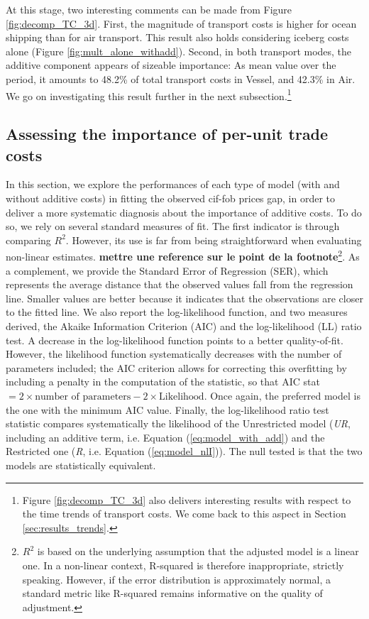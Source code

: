 \documentclass[a4paper,11pt]{article}
\begin{document}
At this stage, two interesting comments can be made from Figure \ref{fig:decomp_TC_3d}. First, the magnitude of transport costs is higher for ocean shipping than for air transport. This result also holds considering iceberg costs alone (Figure \ref{fig:mult_alone_withadd}). Second, in both transport modes, the additive component appears of sizeable importance: As mean value over the period, it amounts to 48.2\% of total transport costs in Vessel, and 42.3\% in Air. We go on investigating this result further in the next subsection.\footnote{Figure \ref{fig:decomp_TC_3d} also delivers interesting results with respect to the time trends of transport costs. We come back to this aspect in Section \ref{sec:results_trends}.}

\subsection{Assessing the importance of per-unit trade costs}

In this section, we explore the performances of each type of model (with and without additive costs) in fitting the observed cif-fob prices gap, in order to deliver a more systematic diagnosis about the importance of additive costs. To do so, we rely on several standard measures of fit. The first indicator is through comparing $R^{2}$. However, its use is far from being straightforward when evaluating non-linear estimates. \textbf{mettre une reference sur le point de la footnote}\footnote{$R^2$ is based on the underlying assumption that the adjusted model is a linear one. In a non-linear context, R-squared is therefore inappropriate, strictly speaking. However, if the error distribution is approximately normal, a standard metric like R-squared remains informative on the quality of adjustment.}. As a complement, we provide the Standard Error of Regression (SER), which represents the average distance that the observed values fall from the regression line. Smaller values are better because it indicates that the observations are closer to the fitted line. We also report the log-likelihood function, and two measures derived, the Akaike Information Criterion (AIC) and the log-likelihood (LL) ratio test. A decrease in the log-likelihood function points to a better quality-of-fit. However, the likelihood function systematically decreases with the number of parameters included; the AIC criterion allows for correcting this overfitting by including a penalty in the computation of the statistic, so that AIC stat $= 2 \times \textrm{number of parameters} - 2 \times \textrm{Likelihood} $. Once again, the preferred model is the one with the minimum AIC value. Finally, the log-likelihood ratio test statistic compares systematically the likelihood of the Unrestricted model (\emph{UR}, including an additive term, i.e. Equation (\ref{eq:model_with_add}) and the Restricted one (\emph{R}, i.e. Equation (\ref{eq:model_nlI})). The null tested is that the two models are statistically equivalent.\medskip
\end{document}
